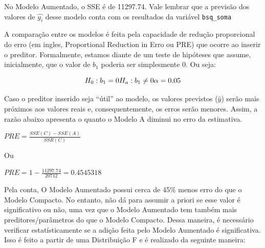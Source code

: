 \documentclass[
]{book}
\newenvironment{Shaded}{\begin{snugshade}}{\end{snugshade}}
\newcommand{\CommentTok}[1]{\textcolor[rgb]{0.56,0.35,0.01}{\textit{#1}}}
\newcommand{\DataTypeTok}[1]{\textcolor[rgb]{0.13,0.29,0.53}{#1}}
\newcommand{\DecValTok}[1]{\textcolor[rgb]{0.00,0.00,0.81}{#1}}
\newcommand{\KeywordTok}[1]{\textcolor[rgb]{0.13,0.29,0.53}{\textbf{#1}}}
\newcommand{\NormalTok}[1]{#1}
\newcommand{\OperatorTok}[1]{\textcolor[rgb]{0.81,0.36,0.00}{\textbf{#1}}}
\newcommand{\StringTok}[1]{\textcolor[rgb]{0.31,0.60,0.02}{#1}}
\begin{document}
No Modelo Aumentado, o SSE é de 11297.74. Vale lembrar que a previsão dos valores de \(\hat{y_i}\) desse modelo conta com os resultados da variável \texttt{bsq\_soma}

\begin{Shaded}
\end{Shaded}

A comparação entre os modelos é feita pela capacidade de redução proporcional do erro (em ingles, Proportional Reduction in Erro ou PRE) que ocorre ao inserir o preditor. Formalmente, estamos diante de um teste de hipóteses que assume, inicialmente, que o valor de \(b_1\) poderia ser simplesmente 0. Ou seja:

\[H_0: b_1 = 0 \\  H_a: b_1 \neq 0 \\ \alpha = 0.05\]

Caso o preditor inserido seja ``útil'' ao modelo, os valores previstos (\(\hat{y}\)) serão mais próximos aos valores reais e, consequentemente, os erros serão menores. Assim, a razão abaixo apresenta o quanto o Modelo A diminui no erro da estimativa.

\(PRE = \frac{SSE(C)-SSE(A)}{SSR(C)}\)

Ou

\(PRE = 1-\frac{11297.74}{20712} = 0.4545318\)

Pela conta, O Modelo Aumentado possui cerca de 45\% menos erro do que o Modelo Compacto. No entanto, não dá para assumir a priori se esse valor é significativo ou não, uma vez que o Modelo Aumentado tem também mais preditores/parâmetros do que o Modelo Compacto. Dessa maneira, é necessário verificar estatísticamente se a adição feita pelo Modelo Aumentado é significativa. Isso é feito a partir de uma Distribuição F e é realizado da seguinte maneira:
\end{document}

